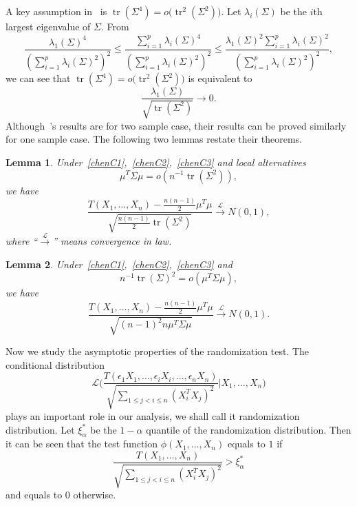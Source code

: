 \documentclass[review]{elsarticle}
\DeclareMathOperator{\mytr}{tr}
\theoremstyle{plain}
\newtheorem{lemma}{Lemma}
\theoremstyle{definition}
\theoremstyle{remark}
\begin{document}
A key assumption in~\citet{Chen2010A} is
    $\mytr (\Sigma^4)=o\big(\mytr ^2(\Sigma^2)\big)$.
    Let $\lambda_i(\Sigma)$ be the $i$th largest eigenvalue of $\Sigma$.
    From
    \begin{equation*}
    \frac{\lambda_1(\Sigma)^4}{(\sum_{i=1}^p \lambda_i(\Sigma)^2)^2}
    \leq
    \frac{\sum_{i=1}^p\lambda_i(\Sigma)^4}{(\sum_{i=1}^p \lambda_i(\Sigma)^2)^2}
    \leq
    \frac{\lambda_1(\Sigma)^2\sum_{i=1}^p\lambda_i(\Sigma)^2}{(\sum_{i=1}^p \lambda_i(\Sigma)^2)^2},
    \end{equation*}
    we can see that 
    $\mytr (\Sigma^4)=o\big(\mytr ^2(\Sigma^2)\big)$ is equivalent to
\begin{equation}\label{chenC3}
    \frac{\lambda_{1}(\Sigma)}{\sqrt{\mytr (\Sigma^2)}}\to 0.
\end{equation}
Although~\citet{Chen2010A}'s results are for two sample case, their results can be proved similarly for one sample case. The following two lemmas restate their theorems.
\begin{lemma}\label{theoremChen}
    Under~\eqref{chenC1},~\eqref{chenC2},~\eqref{chenC3} and local alternatives
    \begin{equation}\label{mu1}
        \mu^T \Sigma\mu=o(n^{-1}\mytr (\Sigma^2)),
    \end{equation}
    we have
        \begin{equation*}
        \frac{T(X_1,\ldots,X_n)-\frac{n(n-1)}{2}\mu^T\mu}{\sqrt{\frac{n(n-1)}{2}\mytr (\Sigma^2)}}\xrightarrow{\mathcal{L}}N(0,1),
        \end{equation*}
        where ``$\xrightarrow{\mathcal{L}}$'' means convergence in law.
\end{lemma}
\begin{lemma}\label{theoremChen2}
    Under~\eqref{chenC1},~\eqref{chenC2},~\eqref{chenC3} and     \begin{equation}\label{mumu1}
     n^{-1}\mytr (\Sigma)^2   =o(\mu^T \Sigma\mu),
    \end{equation}
    we have
        \begin{equation*}
        \frac{T(X_1,\ldots,X_n)-\frac{n(n-1)}{2}\mu^T\mu}{\sqrt{{(n-1)}^2 n \mu^T \Sigma\mu}}\xrightarrow{\mathcal{L}}N(0,1).
        \end{equation*}
\end{lemma}

Now we study the asymptotic properties of the randomization test.
The conditional distribution
        \begin{equation*}
        \mathcal{L}\bigg(\frac{T(\epsilon_1 X_1,\ldots, \epsilon_i X_i,\ldots,\epsilon_n X_n)}{\sqrt{\sum_{1\leq j<i\leq n}{(X_i^T X_j)}^2}}\bigg|X_1,\ldots,X_n\bigg)
        \end{equation*}
 plays an important role in our analysis, we shall call it randomization distribution.
Let $\xi^*_{\alpha}$ be the $1-\alpha$ quantile of the randomization distribution.
Then it can be seen that the test function $\phi(X_1,\ldots,X_n)$ equals to $1$ if
\begin{equation*}
\frac{T(X_1,\ldots, X_n)}{\sqrt{\sum_{1\leq j<i\leq n}{(X_i^T X_j)}^2}}> \xi^*_{\alpha}
\end{equation*}
and equals to $0$ otherwise.
\end{document}
